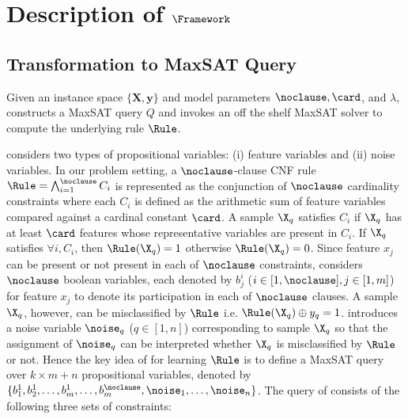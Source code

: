 \section{Description of $ \Framework $}\label{sec:maxsat} 

	

 
	\subsection{Transformation to MaxSAT Query}\label{subsec:maxsat_query}	
	


 
  
 
   Given an instance space $ \{ \mathbf{X}, \mathbf{y} \} $ and  model parameters $ \noclause,\card$, and  $\lambda $, {{\Framework}} constructs a {MaxSAT} query  $ Q $ and invokes an off the shelf MaxSAT solver to compute the underlying rule $ \Rule $.

 

		
	{\Framework} considers two types of propositional variables: (i) feature variables and (ii) noise variables.
 	   In our problem setting, a $ \noclause $-clause CNF rule $ \Rule=\bigwedge_{i=1}^\noclause C_i $ is  represented as the conjunction of  $ \noclause $ cardinality constraints where  each $ C_i $ is defined as   the  arithmetic sum of   feature variables compared against a cardinal constant $ \card $. A  sample $ \X_q $ satisfies  $ C_i $ if $ \X_q $ has at least $ \card $ features whose representative variables are present in $ C_i $. If $ \X_q $ satisfies  $ \forall i, C_i$, then  $ \Rule(\X_q)=1 $ otherwise $ \Rule(\X_q)=0 $. Since  feature $ x_j $ can be present or not present  in each of   $ \noclause $ constraints, {\Framework} considers $ \noclause $  boolean variables, each denoted by $ b_j^i $ ($ i \in [1,\noclause], j \in [1,m] $) for  feature $ x_j $ to denote its participation in each of $ \noclause $ clauses. A sample $ \X_q $, however, can be misclassified by $ \Rule $ i.e. $ \Rule(\X_q)\oplus  y_q =1 $.  {\Framework}  introduces  a noise variable $ \noise_q  $ ($ q \in [1,n] $) corresponding to  sample $ \X_q $ so that the assignment of $ \noise_q $ can be interpreted whether $ \X_q $ is misclassified by $ \Rule $ or not.  Hence the key idea of {{\Framework}} for learning $ \Rule $ is to define a {MaxSAT} query over $k \times m + n$ propositional variables, denoted by $\{ b_{1}^{1}, b_{2}^{1}, \dots ,b_{m}^{1}, \dots ,b_{m}^{\noclause}, \noise_1, \dots ,\noise_n\}$.   The {\MaxSAT} query of {\Framework} consists of the following three sets of constraints:
  

